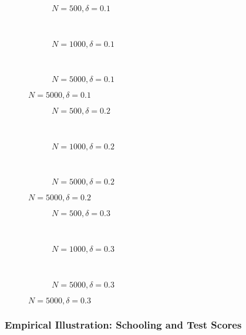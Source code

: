 \documentclass{beamer}
\begin{document}
\begin{frame}
\begin{figure}[h]
  \scriptsize
  \begingroup
  \centering
  \begin{subfigure}[b]{0.31\textwidth}
\caption{\footnotesize $N=500, \delta = 0.1$}
  
  \end{subfigure}
  ~
  \begin{subfigure}[b]{0.31\textwidth}
    \caption{\footnotesize $N=1000, \delta = 0.1$} 
  
  \end{subfigure}
  ~
  \begin{subfigure}[b]{0.31\textwidth}
\caption{\footnotesize $N=5000, \delta = 0.1$}
  
  \end{subfigure}
\endgroup
\end{figure}
\end{frame}

\begin{frame}
\begin{figure}[h]
  \scriptsize
  \begingroup
  \centering
  \begin{subfigure}[b]{0.31\textwidth}
\caption{\footnotesize $N=500, \delta = 0.2$}
  
  \end{subfigure}
  ~
  \begin{subfigure}[b]{0.31\textwidth}
    \caption{\footnotesize $N=1000, \delta = 0.2$} 
  
  \end{subfigure}
 ~ 
  \begin{subfigure}[b]{0.31\textwidth}
\caption{\footnotesize $N=5000, \delta = 0.2$}
  
  \end{subfigure}
\endgroup
\end{figure}
\end{frame}
\begin{frame}
\begin{figure}[h]
  \scriptsize
  \begingroup
  \centering
  \begin{subfigure}[b]{0.31\textwidth}
\caption{\footnotesize $N=500, \delta = 0.3$}
  
  \end{subfigure}
  ~
  \begin{subfigure}[b]{0.31\textwidth}
    \caption{\footnotesize $N=1000, \delta = 0.3$} 
  
  \end{subfigure}
 ~ 
  \begin{subfigure}[b]{0.31\textwidth}
\caption{\footnotesize $N=5000, \delta = 0.3$}
  
  \end{subfigure}
\endgroup
\end{figure}
\end{frame}
\begin{frame}
  \frametitle{Empirical Illustration: Schooling and Test Scores}
\end{frame}
\end{document}
